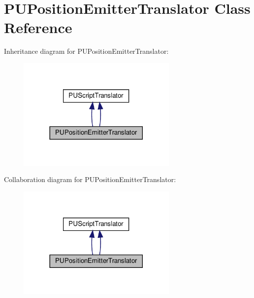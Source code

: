 \hypertarget{classPUPositionEmitterTranslator}{}\section{P\+U\+Position\+Emitter\+Translator Class Reference}
\label{classPUPositionEmitterTranslator}


Inheritance diagram for P\+U\+Position\+Emitter\+Translator\+:
\nopagebreak
\begin{figure}[H]
\begin{center}
\leavevmode
\includegraphics[width=221pt]{classPUPositionEmitterTranslator__inherit__graph}
\end{center}
\end{figure}


Collaboration diagram for P\+U\+Position\+Emitter\+Translator\+:
\nopagebreak
\begin{figure}[H]
\begin{center}
\leavevmode
\includegraphics[width=221pt]{classPUPositionEmitterTranslator__coll__graph}
\end{center}
\end{figure}
